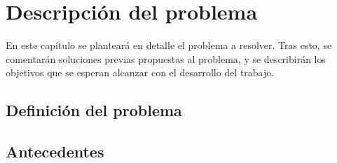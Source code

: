 \chapter{Descripción del problema}

En este capítulo se planteará en detalle el problema a resolver. Tras esto, se comentarán soluciones previas propuestas al problema, y se describirán los objetivos que se esperan alcanzar con el desarrollo del trabajo. 

\section{Definición del problema}

\section{Antecedentes}



